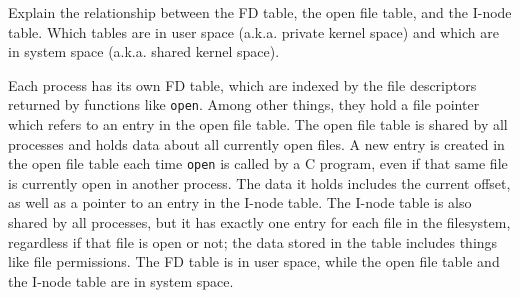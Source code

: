 Explain the relationship between the FD table, the open file table, and the I-node table. Which tables are in user space (a.k.a. private kernel space) and which are in system space (a.k.a. shared kernel space).

\begin{answer}
Each process has its own FD table, which are indexed by the file descriptors returned by functions like \texttt{open}. Among other things, they hold a file pointer which refers to an entry in the open file table. The open file table is shared by all processes and holds data about all currently open files. A new entry is created in the open file table each time \texttt{open} is called by a C program, even if that same file is currently open in another process. The data it holds includes the current offset, as well as a pointer to an entry in the I-node table. The I-node table is also shared by all processes, but it has exactly one entry for each file in the filesystem, regardless if that file is open or not; the data stored in the table includes things like file permissions. The FD table is in user space, while the open file table and the I-node table are in system space.
\end{answer}
